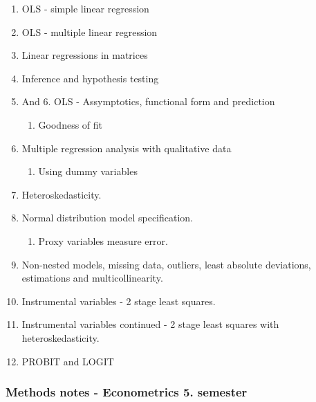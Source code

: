\documentclass[
]{book}
\providecommand{\tightlist}{%
  \setlength{\itemsep}{0pt}\setlength{\parskip}{0pt}}
\begin{document}
\begin{enumerate}
\def\labelenumi{\arabic{enumi}.}
\tightlist
\item
  OLS - simple linear regression
\item
  OLS - multiple linear regression
\item
  Linear regressions in matrices
\item
  Inference and hypothesis testing
\item
  And 6. OLS - Assymptotics, functional form and prediction

  \begin{enumerate}
  \def\labelenumii{\arabic{enumii}.}
  \tightlist
  \item
    Goodness of fit
  \end{enumerate}
\item
  Multiple regression analysis with qualitative data

  \begin{enumerate}
  \def\labelenumii{\arabic{enumii}.}
  \tightlist
  \item
    Using dummy variables
  \end{enumerate}
\item
  Heteroskedasticity.
\item
  Normal distribution model specification.

  \begin{enumerate}
  \def\labelenumii{\arabic{enumii}.}
  \tightlist
  \item
    Proxy variables measure error.
  \end{enumerate}
\item
  Non-nested models, missing data, outliers, least absolute deviations, estimations and multicollinearity.
\item
  Instrumental variables - 2 stage least squares.
\item
  Instrumental variables continued - 2 stage least squares with heteroskedasticity.
\item
  PROBIT and LOGIT
\end{enumerate}

\hypertarget{methods-notes---econometrics-5.-semester}{%
\subsubsection{Methods notes - Econometrics 5. semester}\label{methods-notes---econometrics-5.-semester}}
\end{document}
